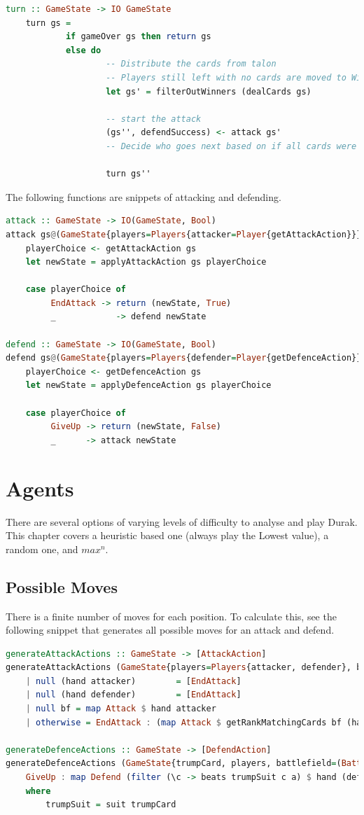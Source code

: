 \documentclass[a4paper, twoside, 12pt]{report}
\begin{document}
\begin{lstlisting}[language=Haskell]
	turn :: GameState -> IO GameState
	turn gs =
			if gameOver gs then return gs
			else do
					-- Distribute the cards from talon
					-- Players still left with no cards are moved to Winners
					let gs' = filterOutWinners (dealCards gs)
	
					-- start the attack
					(gs'', defendSuccess) <- attack gs'
					-- Decide who goes next based on if all cards were defended
	
					turn gs''
\end{lstlisting}

The following functions are snippets of attacking and defending.

\begin{lstlisting}[language=Haskell]
attack :: GameState -> IO(GameState, Bool)
attack gs@(GameState{players=Players{attacker=Player{getAttackAction}}}) = do
    playerChoice <- getAttackAction gs
    let newState = applyAttackAction gs playerChoice

    case playerChoice of 
         EndAttack -> return (newState, True)
         _            -> defend newState

defend :: GameState -> IO(GameState, Bool)
defend gs@(GameState{players=Players{defender=Player{getDefenceAction}}}) = do
    playerChoice <- getDefenceAction gs
    let newState = applyDefenceAction gs playerChoice

    case playerChoice of 
         GiveUp -> return (newState, False)
         _      -> attack newState
\end{lstlisting}


\chapter{Agents}
There are several options of varying levels of difficulty to analyse and play Durak. This chapter covers a heuristic based one (always play the Lowest value), a random one, and \(max^n\).

\section{Possible Moves}
There is a finite number of moves for each position. To calculate this, see the following snippet that generates all possible moves for an attack and defend.

\begin{lstlisting}[language=Haskell]
generateAttackActions :: GameState -> [AttackAction]
generateAttackActions (GameState{players=Players{attacker, defender}, battlefield=bf})
    | null (hand attacker)        = [EndAttack]
    | null (hand defender)        = [EndAttack]
    | null bf = map Attack $ hand attacker
    | otherwise = EndAttack : (map Attack $ getRankMatchingCards bf (hand attacker))

generateDefenceActions :: GameState -> [DefendAction]
generateDefenceActions (GameState{trumpCard, players, battlefield=(Battle a Nothing:_)}) =
	GiveUp : map Defend (filter (\c -> beats trumpSuit c a) $ hand (defender players))
	where
		trumpSuit = suit trumpCard
\end{lstlisting}
\end{document}
